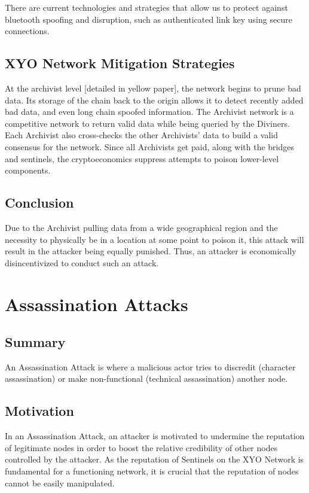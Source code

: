 \documentclass{article}
\begin{document}
There are current technologies and strategies that allow us to protect against bluetooth spoofing and disruption, such as authenticated link key using secure connections. \cite{bluetooth2}

\subsection{XYO Network Mitigation Strategies}
At the \gls{archivist} level [detailed in yellow paper], the network begins to prune bad data. Its storage of the chain back to the origin allows it to detect recently added bad data, and even long chain spoofed information. The Archivist network is a competitive network to return valid data while being queried by the Diviners. Each Archivist also cross-checks the other Archivists' data to build a valid consensus for the network. Since all Archivists get paid, along with the \gls{bridge}s and sentinels, the cryptoeconomics suppress attempts to poison lower-level components.

\subsection{Conclusion}
Due to the Archivist pulling data from a wide geographical region and the necessity to physically be in a location at some point to poison it, this attack will result in the attacker being equally punished. Thus, an attacker is economically disincentivized to conduct such an attack.  


\section{Assassination Attacks}

\subsection{Summary}

An Assassination Attack is where a malicious actor tries to discredit (character assassination) or make non-functional (technical assassination) another node.

\subsection{Motivation}

In an Assassination Attack, an attacker is motivated to undermine the reputation of legitimate nodes in order to boost the relative credibility of other nodes controlled by the attacker. As the reputation of Sentinels on the XYO Network is fundamental for a functioning network, it is crucial that the reputation of nodes cannot be easily manipulated.
\end{document}

